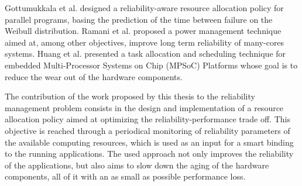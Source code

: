 Gottumukkala et al. \cite{4629245} designed a reliability-aware resource allocation policy for parallel programs, basing the prediction of the time between failure on the Weibull distribution. Ramani et al. \cite{7530840} proposed a power management technique aimed at, among other objectives, improve long term reliability of many-cores systems. Huang et al. \cite{5090632} presented a task allocation and scheduling technique for embedded Multi-Processor Systems on Chip (MPSoC) Platforms whose goal is to reduce the wear out of the hardware components.

The contribution of the work proposed by this thesis to the reliability management problem consists in the design and implementation of a resource allocation policy aimed at optimizing the reliability-performance trade off. This objective is reached through a periodical monitoring of reliability parameters of the available computing resources, which is used as an input for a smart binding to the running applications. The used approach not only improves the reliability of the applications, but also aims to slow down the aging of the hardware components, all of it with an as small as possible performance loss.